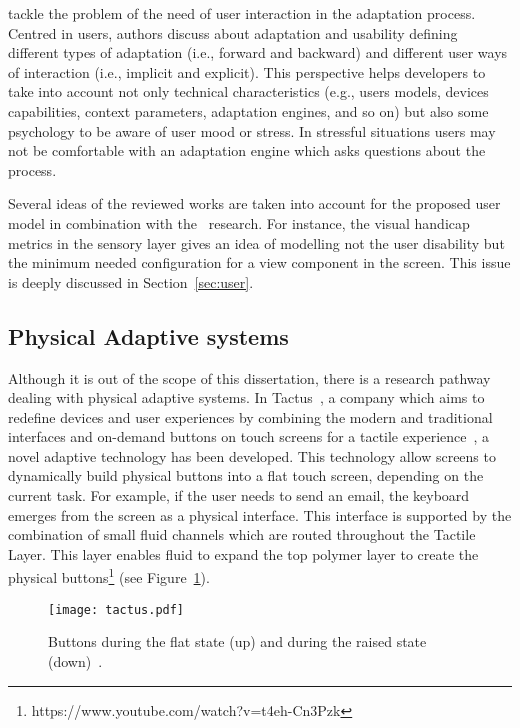 \citet{evers_achieving_2012} tackle the problem of the need of user interaction 
in the adaptation process. Centred in users, authors discuss about adaptation 
and usability defining different types of adaptation (i.e., forward and backward) 
and different user ways of interaction (i.e., implicit and explicit). This 
perspective helps developers to take into account not only technical 
characteristics (e.g., users models, devices capabilities, context parameters, 
adaptation engines, and so on) but also some psychology to be aware of user mood 
or stress. In stressful situations users may not be comfortable with an adaptation 
engine which asks questions about the process.

Several ideas of the reviewed works are taken into account for the proposed user 
model in combination with the~\citet{casas_user_2008} research. For instance,
the visual handicap metrics in the sensory layer gives an idea of modelling
not the user disability but the minimum needed configuration for a view component
in the screen. This issue is deeply discussed in Section~\ref{sec:user}.

\subsection{Physical Adaptive systems}
\label{sec:pyshical_adaptive_sistems}

Although it is out of the scope of this dissertation, there is a research
pathway dealing with physical adaptive systems. In Tactus~\citep{tactus}, a
company which aims to redefine devices and user experiences by combining the 
modern and traditional interfaces and on-demand buttons on touch
screens for a tactile experience~\citep{tactus_linkedin}, a novel adaptive
technology has been developed. This technology allow screens to dynamically build
physical buttons into a flat touch screen, depending on the current task. For example,
if the user needs to send an email, the keyboard emerges from the screen
as a physical interface. This interface is supported by the combination of
small fluid channels which are routed throughout the Tactile Layer. This layer
enables fluid to expand the top polymer layer to create the physical buttons\footnote{https://www.youtube.com/watch?v=t4eh-Cn3Pzk} 
(see Figure~\ref{fig:tactus}).

\begin{figure}[H]
\centering
\texttt{[image: tactus.pdf]}
\caption{Buttons during the flat state (up) and during the raised state (down)~\citep{tactus}.}
\label{fig:tactus}
\end{figure}

